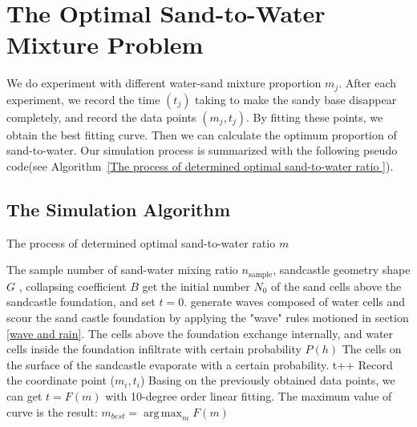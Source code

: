 \documentclass{mcmthesis}		    %
\DeclareMathOperator*{\argmax}{arg\,max}
\begin{document}
    \section{The Optimal Sand-to-Water Mixture Problem} 
    We do experiment with different water-sand mixture proportion $m_j$. After each experiment, we record the time $(t_j)$ taking to make the sandy base disappear completely, and record the data points $(m_j, t_j)$. By fitting these points, we obtain the best fitting curve. Then we can calculate the optimum proportion of sand-to-water. Our simulation process is summarized with the following pseudo code(see Algorithm~\ref{The process of determined optimal sand-to-water ratio }). 
    \subsection{The Simulation Algorithm} 	
    \begin{algorithm}[htbp!]
	\caption{\small{The process of determined optimal sand-to-water ratio $m$}}
    	\begin{algorithmic}[1]\small
    		\REQUIRE The sample number of sand-water mixing ratio $n_\text{sample}$, sandcastle geometry shape $G$ , collapsing coefficient $B$
            \STATE {Randomly sample $mi \in [1,+\inf)$ and initialize CA system for geometry $G_i$ by determining all the cells inside the geometry.}
            \STATE get the initial number $N_0$ of the sand cells above the sandcastle foundation, and set $t=0$.
            \STATE generate waves composed of water cells and scour the sand castle foundation by applying the "wave" rules motioned in section \ref{wave and rain}.
            \STATE The cells above the foundation exchange internally, and water cells inside the foundation infiltrate with certain probability $P(h)$
            \STATE The cells on the surface of the sandcastle evaporate with a certain probability.
            \STATE t++
            \ENDWHILE
            \STATE Record the coordinate point ($m_i,t_i$) 
            \ENDFOR
            \STATE Basing on the previously obtained data points, we can get $t=F(m)$ with 10-degree order linear fitting.
            \STATE The maximum value of curve is the result: $m_{best}=\argmax_m F(m)$
    	\end{algorithmic}
		\label{The process of determined optimal sand-to-water ratio }
\end{algorithm}
    
\end{document}
